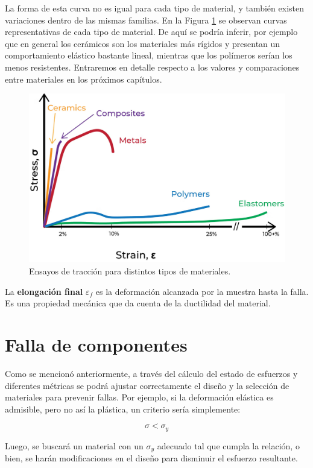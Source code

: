 La forma de esta curva no es igual para cada tipo de material, y también existen variaciones dentro de las mismas familias. En la Figura \ref{fig:3} se observan curvas representativas de cada tipo de material. De aquí se podría inferir, por ejemplo que en general los cerámicos son los materiales más rígidos y presentan un comportamiento elástico bastante lineal, mientras que los polímeros serían los menos resistentes. Entraremos en detalle respecto a los valores y comparaciones entre materiales en los próximos capítulos.

\begin{figure}[h!]
    \centering
    \includegraphics[width=0.75\linewidth]{imgs/tract.png}
    \caption{Ensayos de tracción para distintos tipos de materiales.}
    \label{fig:3}
\end{figure}

La \textbf{elongación final} $\varepsilon_{f}$ es la deformación alcanzada por la muestra hasta la falla. Es una propiedad mecánica que da cuenta de la ductilidad del material.

\section{Falla de componentes}

Como se mencionó anteriormente, a través del cálculo del estado de esfuerzos y diferentes métricas se podrá ajustar correctamente el diseño y la selección de materiales para prevenir fallas. Por ejemplo, si la deformación elástica es admisible, pero no así la plástica, un criterio sería simplemente:

\begin{equation}
    \sigma < \sigma_{y}
\end{equation}

Luego, se buscará un material con un $\sigma_{y}$ adecuado tal que cumpla la relación, o bien, se harán modificaciones en el diseño para disminuir el esfuerzo resultante. 

